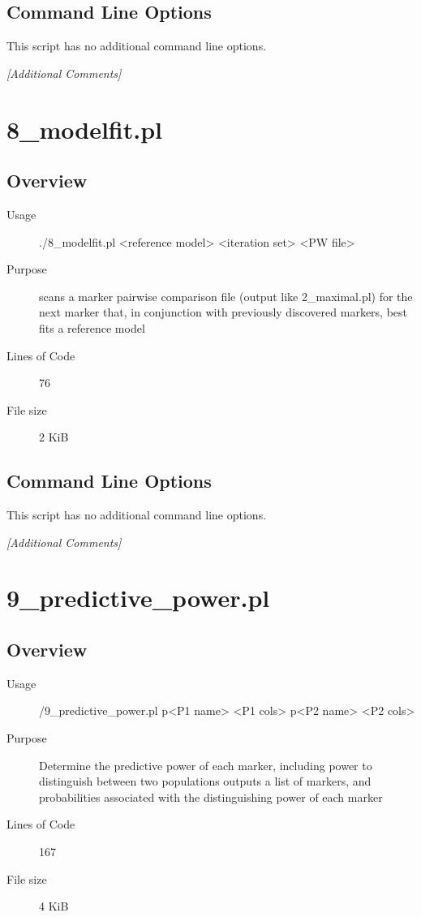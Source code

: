 \subsection{Command Line Options}
\label{sec:5-pop-minimal.pl-command-line}

This script has no additional command line options.

\emph{[Additional Comments]}

\section{8_modelfit.pl}
\label{sec:8-modelfit.pl}

\subsection{Overview}
\label{sec:8-modelfit.pl-overview}

\begin{description}
\item[Usage] ./8_modelfit.pl <reference model> <iteration set> <PW file>
\item[Purpose] scans a marker pairwise comparison file (output like 2_maximal.pl) for the next marker that, in conjunction with previously discovered markers, best fits a reference model
\item[Lines of Code] 76
\item[File size] 2 KiB
\end{description}

\subsection{Command Line Options}
\label{sec:8-modelfit.pl-command-line}

This script has no additional command line options.

\emph{[Additional Comments]}

\section{9_predictive_power.pl}
\label{sec:9-predictive-power.pl}

\subsection{Overview}
\label{sec:9-predictive-power.pl-overview}

\begin{description}
\item[Usage] /9_predictive_power.pl p<P1 name> <P1 cols> p<P2 name> <P2 cols>
\item[Purpose] Determine the predictive power of each marker, including power to distinguish between two populations outputs a list of markers, and probabilities associated with the distinguishing power of each marker
\item[Lines of Code] 167
\item[File size] 4 KiB
\end{description}

